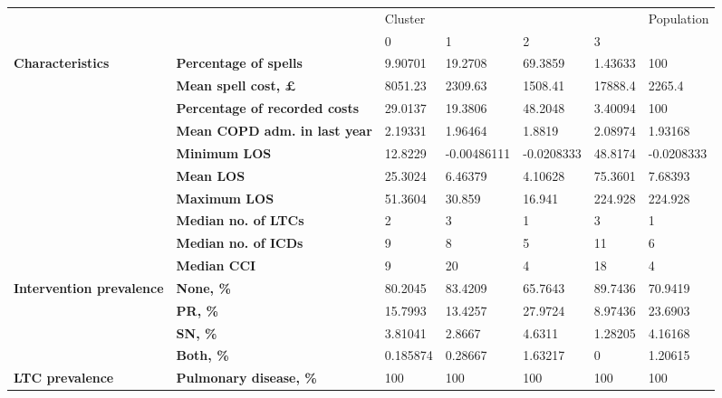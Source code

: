\begin{tabular}{lllllll}
\toprule
               &        &   Cluster &             &            &           & Population \\
               &        &         0 &           1 &          2 &         3 &            \\
\midrule
\textbf{Characteristics} & \textbf{Percentage of spells} &   9.90701 &     19.2708 &    69.3859 &   1.43633 &        100 \\
               & \textbf{Mean spell cost, £} &   8051.23 &     2309.63 &    1508.41 &   17888.4 &     2265.4 \\
               & \textbf{Percentage of recorded costs} &   29.0137 &     19.3806 &    48.2048 &   3.40094 &        100 \\
               & \textbf{Mean COPD adm. in last year} &   2.19331 &     1.96464 &     1.8819 &   2.08974 &    1.93168 \\
               & \textbf{Minimum LOS} &   12.8229 & -0.00486111 & -0.0208333 &   48.8174 & -0.0208333 \\
               & \textbf{Mean LOS} &   25.3024 &     6.46379 &    4.10628 &   75.3601 &    7.68393 \\
               & \textbf{Maximum LOS} &   51.3604 &      30.859 &     16.941 &   224.928 &    224.928 \\
               & \textbf{Median no. of LTCs} &         2 &           3 &          1 &         3 &          1 \\
               & \textbf{Median no. of ICDs} &         9 &           8 &          5 &        11 &          6 \\
               & \textbf{Median CCI} &         9 &          20 &          4 &        18 &          4 \\
\textbf{Intervention prevalence} & \textbf{None, \%} &   80.2045 &     83.4209 &    65.7643 &   89.7436 &    70.9419 \\
               & \textbf{PR, \%} &   15.7993 &     13.4257 &    27.9724 &   8.97436 &    23.6903 \\
               & \textbf{SN, \%} &   3.81041 &      2.8667 &     4.6311 &   1.28205 &    4.16168 \\
               & \textbf{Both, \%} &  0.185874 &     0.28667 &    1.63217 &         0 &    1.20615 \\
\textbf{LTC prevalence} & \textbf{Pulmonary disease, \%} &       100 &         100 &        100 &       100 &        100 \\

\end{tabular}
